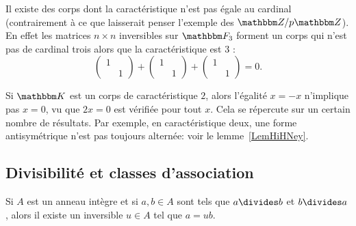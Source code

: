 \begin{example}
    Il existe des corps dont la caractéristique n'est pas égale au cardinal (contrairement à ce que laisserait penser l'exemple des \( \eZ/p\eZ\)). En effet les matrices \( n\times n\) inversibles sur \( \eF_{3}\) forment un corps qui n'est pas de cardinal trois alors que la caractéristique est \( 3\) :
    \begin{equation}
        \begin{pmatrix}
            1    &       \\
                &   1
            \end{pmatrix}+\begin{pmatrix}
                1    &       \\
                    &   1
                \end{pmatrix}+\begin{pmatrix}
                    1    &       \\
                        &   1
                \end{pmatrix}=0.
    \end{equation}
\end{example}

\begin{example}
    Si \( \eK\) est un corps de caractéristique \( 2\), alors l'égalité \( x=-x\) n'implique pas \( x=0\), vu que \( 2x=0\) est vérifiée pour tout \( x\). Cela se répercute sur un certain nombre de résultats. Par exemple, en caractéristique deux, une forme antisymétrique n'est pas toujours alternée: voir le lemme~\ref{LemHiHNey}.
\end{example}

\subsection{Divisibilité et classes d'association}
\label{DivisibiliteAnneauxIntegres}

\begin{lemma}\label{LemRmVTRq}
    Si \( A\) est un anneau intègre et si \( a,b\in A\) sont tels que \( a\divides b\) et \( b\divides a\), alors il existe un inversible \( u\in A\) tel que \( a=ub\).
\end{lemma}

